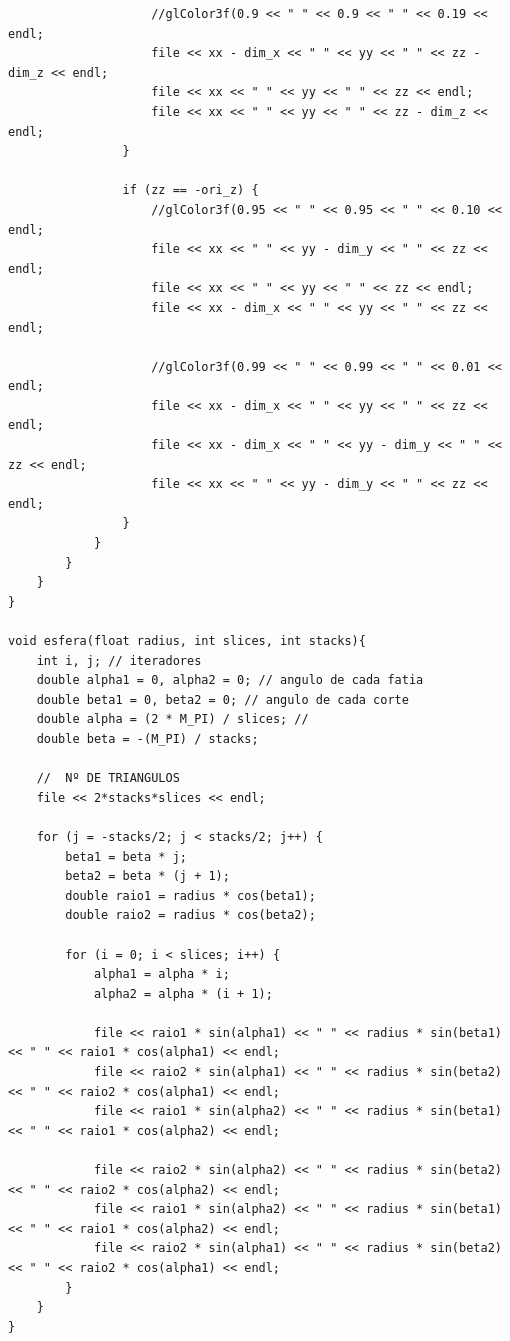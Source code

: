 \documentclass{report}
\begin{document}
\begin{lstlisting}
                    //glColor3f(0.9 << " " << 0.9 << " " << 0.19 << endl;
                    file << xx - dim_x << " " << yy << " " << zz - dim_z << endl;
                    file << xx << " " << yy << " " << zz << endl;
                    file << xx << " " << yy << " " << zz - dim_z << endl;
                }

                if (zz == -ori_z) {
                    //glColor3f(0.95 << " " << 0.95 << " " << 0.10 << endl;
                    file << xx << " " << yy - dim_y << " " << zz << endl;
                    file << xx << " " << yy << " " << zz << endl;
                    file << xx - dim_x << " " << yy << " " << zz << endl;

                    //glColor3f(0.99 << " " << 0.99 << " " << 0.01 << endl;
                    file << xx - dim_x << " " << yy << " " << zz << endl;
                    file << xx - dim_x << " " << yy - dim_y << " " << zz << endl;
                    file << xx << " " << yy - dim_y << " " << zz << endl;
                }
            }
        }
    }
}

void esfera(float radius, int slices, int stacks){
    int i, j; // iteradores
    double alpha1 = 0, alpha2 = 0; // angulo de cada fatia
    double beta1 = 0, beta2 = 0; // angulo de cada corte
    double alpha = (2 * M_PI) / slices; //
    double beta = -(M_PI) / stacks;

    //  Nº DE TRIANGULOS
    file << 2*stacks*slices << endl;

    for (j = -stacks/2; j < stacks/2; j++) {
        beta1 = beta * j;
        beta2 = beta * (j + 1);
        double raio1 = radius * cos(beta1);
        double raio2 = radius * cos(beta2);

        for (i = 0; i < slices; i++) {
            alpha1 = alpha * i;
            alpha2 = alpha * (i + 1);

            file << raio1 * sin(alpha1) << " " << radius * sin(beta1) << " " << raio1 * cos(alpha1) << endl;
            file << raio2 * sin(alpha1) << " " << radius * sin(beta2) << " " << raio2 * cos(alpha1) << endl;
            file << raio1 * sin(alpha2) << " " << radius * sin(beta1) << " " << raio1 * cos(alpha2) << endl;

            file << raio2 * sin(alpha2) << " " << radius * sin(beta2) << " " << raio2 * cos(alpha2) << endl;
            file << raio1 * sin(alpha2) << " " << radius * sin(beta1) << " " << raio1 * cos(alpha2) << endl;
            file << raio2 * sin(alpha1) << " " << radius * sin(beta2) << " " << raio2 * cos(alpha1) << endl;
        }
    }
}


\end{lstlisting}
\end{document}
